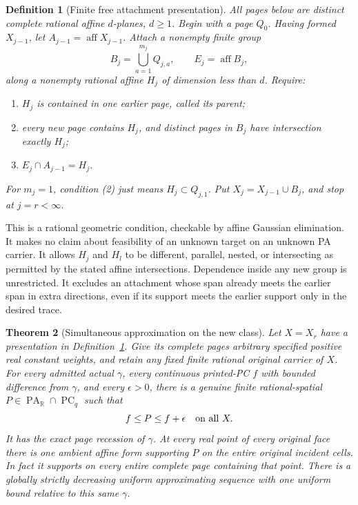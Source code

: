 \documentclass[11pt]{article}
\newtheorem{theorem}{Theorem}[section]
\newtheorem{definition}[theorem]{Definition}
\newcommand{\R}{\mathbb R}
\newcommand{\PA}{\operatorname{PA}}
\newcommand{\PC}{\operatorname{PC}_q}
\newcommand{\aff}{\operatorname{aff}}
\begin{document}
\begin{definition}[Finite free attachment presentation]\label{def:free}
All pages below are distinct complete rational affine $d$-planes, $d\geq1$. Begin with a page $Q_0$. Having formed $X_{j-1}$, let $A_{j-1}=\aff X_{j-1}$. Attach a nonempty finite group
\[
B_j=\bigcup_{a=1}^{m_j}Q_{j,a},\qquad E_j=\aff B_j,
\]
along a nonempty rational affine $H_j$ of dimension less than $d$. Require:
\begin{enumerate}
\item $H_j$ is contained in one earlier page, called its parent;
\item every new page contains $H_j$, and distinct pages in $B_j$ have intersection exactly $H_j$;
\item $E_j\cap A_{j-1}=H_j$.
\end{enumerate}
For $m_j=1$, condition (2) just means $H_j\subset Q_{j,1}$. Put $X_j=X_{j-1}\cup B_j$, and stop at $j=r<\infty$.
\end{definition}
This is a rational geometric condition, checkable by affine Gaussian elimination. It makes no claim about feasibility of an unknown target on an unknown PA carrier. It allows $H_j$ and $H_l$ to be different, parallel, nested, or intersecting as permitted by the stated affine intersections. Dependence inside any new group is unrestricted. It excludes an attachment whose span already meets the earlier span in extra directions, even if its support meets the earlier support only in the desired trace.

\begin{theorem}[Simultaneous approximation on the new class]\label{thm:main}
Let $X=X_r$ have a presentation in Definition~\ref{def:free}. Give its complete pages arbitrary specified positive real constant weights, and retain any fixed finite rational original carrier of $X$. For every admitted actual $\gamma$, every continuous printed-PC $f$ with bounded difference from $\gamma$, and every $\epsilon>0$, there is a genuine finite rational-spatial $P\in\PA_\R\cap\PC$ such that
\[
f\leq P\leq f+\epsilon\quad\hbox{on all }X.
\]
It has the exact page recession of $\gamma$. At every real point of every original face there is one ambient affine form supporting $P$ on the entire original incident cells. In fact it supports on every entire complete page containing that point. There is a globally strictly decreasing uniform approximating sequence with one uniform bound relative to this same $\gamma$.
\end{theorem}
\end{document}

